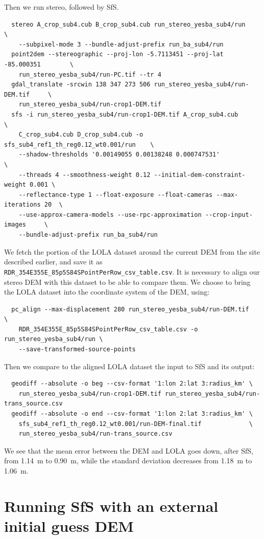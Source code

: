 Then we run stereo, followed by SfS. 
\begin{verbatim}
  stereo A_crop_sub4.cub B_crop_sub4.cub run_stereo_yesba_sub4/run             \
    --subpixel-mode 3 --bundle-adjust-prefix run_ba_sub4/run
  point2dem --stereographic --proj-lon -5.7113451 --proj-lat -85.000351        \
    run_stereo_yesba_sub4/run-PC.tif --tr 4
  gdal_translate -srcwin 138 347 273 506 run_stereo_yesba_sub4/run-DEM.tif     \
    run_stereo_yesba_sub4/run-crop1-DEM.tif 
  sfs -i run_stereo_yesba_sub4/run-crop1-DEM.tif A_crop_sub4.cub               \
    C_crop_sub4.cub D_crop_sub4.cub -o sfs_sub4_ref1_th_reg0.12_wt0.001/run    \
    --shadow-thresholds '0.00149055 0.00138248 0.000747531'                    \
    --threads 4 --smoothness-weight 0.12 --initial-dem-constraint-weight 0.001 \
    --reflectance-type 1 --float-exposure --float-cameras --max-iterations 20  \
    --use-approx-camera-models --use-rpc-approximation --crop-input-images     \
    --bundle-adjust-prefix run_ba_sub4/run
\end{verbatim}

We fetch the portion of the LOLA dataset around the current DEM from the
site described earlier, and save it as
\verb#RDR_354E355E_85p5S84SPointPerRow_csv_table.csv#. It is necessary
to align our stereo DEM with this dataset to be able to compare
them. We choose to bring the LOLA dataset into the coordinate system
of the DEM, using:
\begin{verbatim}
  pc_align --max-displacement 280 run_stereo_yesba_sub4/run-DEM.tif             \
    RDR_354E355E_85p5S84SPointPerRow_csv_table.csv -o run_stereo_yesba_sub4/run \
    --save-transformed-source-points
\end{verbatim}

Then we compare to the aligned LOLA dataset the input to SfS and its output:
\begin{verbatim}
  geodiff --absolute -o beg --csv-format '1:lon 2:lat 3:radius_km' \
    run_stereo_yesba_sub4/run-crop1-DEM.tif run_stereo_yesba_sub4/run-trans_source.csv
  geodiff --absolute -o end --csv-format '1:lon 2:lat 3:radius_km' \
    sfs_sub4_ref1_th_reg0.12_wt0.001/run-DEM-final.tif             \
    run_stereo_yesba_sub4/run-trans_source.csv
\end{verbatim}

We see that the mean error between the DEM and LOLA goes down, after SfS,
from  1.14~m to 0.90~m, while the standard deviation decreases from
 1.18~m to 1.06~m.

\section{Running SfS with an external initial guess DEM}

